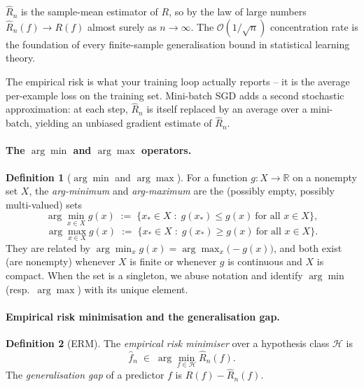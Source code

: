\documentclass[11pt]{article}
\theoremstyle{definition}
\newtheorem{definition}{Definition}
\begin{document}
\begin{mathnote}
$\widehat{R}_n$ is the sample-mean estimator of $R$, so by the law of large
numbers $\widehat{R}_n(f) \to R(f)$ almost surely as $n \to \infty$. The
$\mathcal{O}(1/\sqrt{n})$ concentration rate is the foundation of every
finite-sample generalisation bound in statistical learning theory.
\end{mathnote}

\begin{mlnote}
The empirical risk is what your training loop actually reports -- it is the
average per-example loss on the training set. Mini-batch SGD adds a second
stochastic approximation: at each step, $\widehat{R}_n$ is itself replaced
by an average over a mini-batch, yielding an unbiased gradient estimate of
$\widehat{R}_n$.
\end{mlnote}

\paragraph{The $\arg\min$ and $\arg\max$ operators.}

\begin{definition}[$\arg\min$ and $\arg\max$]
For a function $g : X \to \mathbb{R}$ on a nonempty set $X$, the
\emph{arg-minimum} and \emph{arg-maximum} are the (possibly empty, possibly
multi-valued) sets
\[
  \arg\min_{x \in X} g(x) \;:=\; \bigl\{ x_{\ast} \in X \;:\;
    g(x_{\ast}) \leq g(x)\ \text{for all } x \in X \bigr\},
\]
\[
  \arg\max_{x \in X} g(x) \;:=\; \bigl\{ x_{\ast} \in X \;:\;
    g(x_{\ast}) \geq g(x)\ \text{for all } x \in X \bigr\}.
\]
They are related by
$\arg\min_{x} g(x) = \arg\max_{x}\!\bigl(-g(x)\bigr)$, and both exist (are
nonempty) whenever $X$ is finite or whenever $g$ is continuous and $X$ is
compact. When the set is a singleton, we abuse notation and identify
$\arg\min$ (resp.\ $\arg\max$) with its unique element.
\end{definition}

\paragraph{Empirical risk minimisation and the generalisation gap.}

\begin{definition}[ERM]
The \emph{empirical risk minimiser} over a hypothesis class $\mathcal{H}$ is
\[
  \widehat{f}_n \;\in\; \arg\min_{f \in \mathcal{H}} \widehat{R}_n(f).
\]
The \emph{generalisation gap} of a predictor $f$ is
$R(f) - \widehat{R}_n(f)$.
\end{definition}
\end{document}

